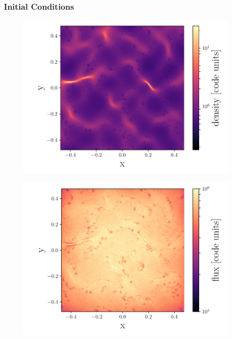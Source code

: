\documentclass[fleq,usenatbib]{mnras}
\begin{document}
\subsubsection{Initial Conditions}
\begin{figure}
\includegraphics[width=1\linewidth]{Figures/sine_rho.pdf}
\caption{}
\label{fig:sine_rho}
\end{figure}
\begin{figure}
\includegraphics[width=1\linewidth]{Figures/sine_radFlux.pdf}
\caption{}
\label{fig:sine_radFlux}
\end{figure}
\end{document}
